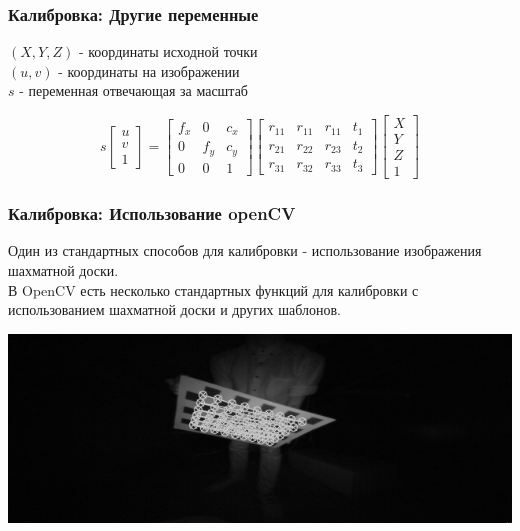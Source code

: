 \documentclass{beamer}
\begin{document}
		\begin{frame}
			\frametitle{Калибровка: Другие переменные}
			
			$(X,Y,Z)$ - координаты исходной точки\\
			$(u,v)$ - координаты на изображении\\
			$s$ - переменная отвечающая за масштаб
			
			\begin{equation*}
			s
			\begin{bmatrix}
			u\\v\\1
			\end{bmatrix}
			=
			\begin{bmatrix}
			f_{x}&0&c_{x}\\
			0&f_{y}&c_{y}\\
			0&0&1
			\end{bmatrix}
			\begin{bmatrix}
			r_{11}&r_{11}&r_{11}&t_{1}\\
			r_{21}&r_{22}&r_{23}&t_{2}\\
			r_{31}&r_{32}&r_{33}&t_{3}
			\end{bmatrix}
			\begin{bmatrix}
			X\\Y\\Z\\1
			\end{bmatrix}
			\end{equation*}
		\end{frame}
		
		\begin{frame}
			\frametitle{Калибровка: Использование openCV}
			
			Один из стандартных способов для калибровки - использование изображения 
			шахматной доски.\\
			В OpenCV есть несколько стандартных функций для калибровки с использованием 
			шахматной доски и других шаблонов.
			
			\begin{center}
				\includegraphics[scale=0.7]{images/leftCo2}
			\end{center}
		\end{frame}
		
\end{document}
